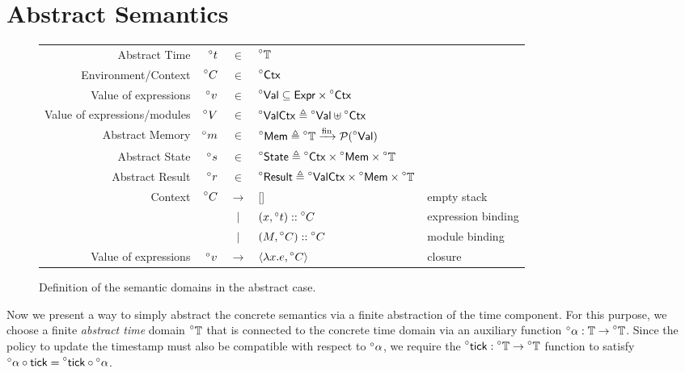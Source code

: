 \documentclass[acmsmall,review]{acmart}\settopmatter{printfolios=true,printccs=false,printacmref=false}
\theoremstyle{definition}
\theoremstyle{plain}
\newcommand*{\vbar}{|}
\newcommand*{\cons}{::}
\newcommand*{\pset}{\mathcal{P}}
\newcommand*{\A}[1]{\prescript{\circ}{}{#1}}
\newcommand*{\Expr}{\mathsf{Expr}}
\newcommand*{\Time}{\mathbb{T}}
\newcommand*{\Ctx}{\mathsf{Ctx}}
\newcommand*{\Value}{\mathsf{Val}}
\newcommand*{\Mem}{\mathsf{Mem}}
\newcommand*{\mem}{m}
\newcommand*{\State}{\mathsf{State}}
\newcommand*{\Result}{\mathsf{Result}}
\newcommand*{\fin}[2]{{#1}\xrightarrow{\text{fin}}{#2}}
\newcommand*{\tick}{\mathsf{tick}}
\begin{document}
\section{Abstract Semantics}
\begin{figure}[h!]
  \centering
  \begin{tabular}{rrcll}
    Abstract Time                & $\A{t}$    & $\in$         & $\A{\Time}$                                                                               \\
    Environment/Context          & $\A{C}$    & $\in$         & $\A{\Ctx}$                                                                                \\
    Value of expressions         & $\A{v}$    & $\in$         & $\A{\Value} \subseteq \Expr\times\A{\Ctx}$                                                \\
    Value of expressions/modules & $\A{V}$    & $\in$         & $\A{\Value\Ctx}\triangleq\A{\Value}\uplus\A{\Ctx}$                                        \\
    Abstract Memory              & $\A{\mem}$ & $\in$         & $\A{\Mem} \triangleq \fin{\A{\Time}}{\pset(\A{\Value})}$                                  \\
    Abstract State               & $\A{s}$    & $\in$         & $\A{\State} \triangleq \A{\Ctx}\times\A{\Mem}\times\A{\Time}$                             \\
    Abstract Result              & $\A{r}$    & $\in$         & $\A{\Result} \triangleq \A{\Value\Ctx}\times\A{\Mem}\times\A{\Time}$                      \\
    Context                      & $\A{C}$    & $\rightarrow$ & []                                                                   & empty stack        \\
                                 &            & $\vbar$       & $(x,\A{t})\cons \A{C}$                                               & expression binding \\
                                 &            & $\vbar$       & $(M,\A{C})\cons \A{C}$                                               & module binding     \\
    Value of expressions         & $\A{v}$    & $\rightarrow$ & $\langle \lambda x.e, \A{C} \rangle$                                 & closure
  \end{tabular}
  \caption{Definition of the semantic domains in the abstract case.}
  \label{fig:absdom}
\end{figure}
Now we present a way to simply abstract the concrete semantics via a finite abstraction of the time component.
For this purpose, we choose a finite \emph{abstract time} domain $\A\Time$ that is connected to the concrete time domain via an auxiliary function $\A\alpha:\Time\rightarrow\A\Time$.
Since the policy to update the timestamp must also be compatible with respect to $\A\alpha$, we require the $\A\tick:\A\Time\rightarrow\A\Time$ function to satisfy $\A\alpha\circ\tick=\A\tick\circ\A\alpha$.
\end{document}
